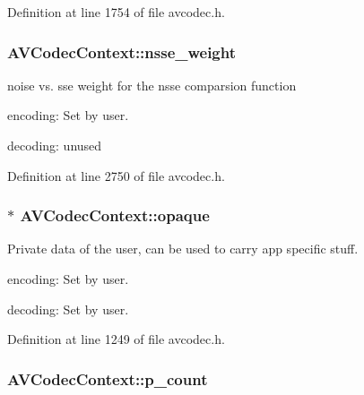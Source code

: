 Definition at line 1754 of file avcodec.\+h.

\subsubsection[{\texorpdfstring{nsse\+\_\+weight}{nsse_weight}}]{ A\+V\+Codec\+Context\+::nsse\+\_\+weight}\hypertarget{struct_a_v_codec_context_a01e1ed5a7828461239d017147a0c5959}{}\label{struct_a_v_codec_context_a01e1ed5a7828461239d017147a0c5959}
noise vs. sse weight for the nsse comparsion function
\begin{DoxyItemize}
\item encoding\+: Set by user.
\item decoding\+: unused 
\end{DoxyItemize}

Definition at line 2750 of file avcodec.\+h.

\subsubsection[{\texorpdfstring{opaque}{opaque}}]{$\ast$ A\+V\+Codec\+Context\+::opaque}\hypertarget{struct_a_v_codec_context_aab9c4495feeedde28c1e908d76b7b9f5}{}\label{struct_a_v_codec_context_aab9c4495feeedde28c1e908d76b7b9f5}
Private data of the user, can be used to carry app specific stuff.
\begin{DoxyItemize}
\item encoding\+: Set by user.
\item decoding\+: Set by user. 
\end{DoxyItemize}

Definition at line 1249 of file avcodec.\+h.

\subsubsection[{\texorpdfstring{p\+\_\+count}{p_count}}]{ A\+V\+Codec\+Context\+::p\+\_\+count}\hypertarget{struct_a_v_codec_context_ae9c7434aa338d941423b45034e2a7854}{}\label{struct_a_v_codec_context_ae9c7434aa338d941423b45034e2a7854}


